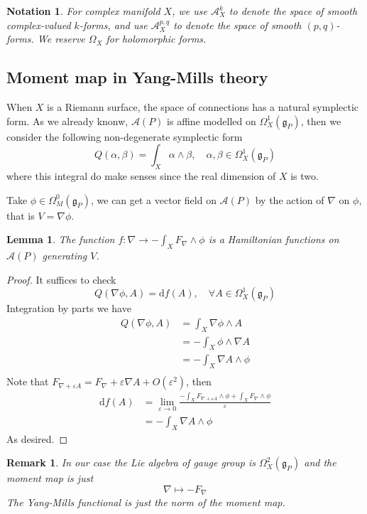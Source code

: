 \documentclass[11pt]{amsart}
\numberwithin{equation}{section}
\theoremstyle{plain}
\theoremstyle{plain}
\newtheorem{lemmasub}[thmsub]{Lemma}
\newtheorem{remksub}[thmsub]{Remark}
\newtheorem{notasub}[thmsub]{Notation}
\numberwithin{equation}{section}
\begin{document}
\begin{notasub}\normalfont
For complex manifold $X$, we use $\mathcal{A}_X^k$ to denote the space of smooth complex-valued $k$-forms, and use $\mathcal{A}_X^{p,q}$ to denote the space of smooth $(p,q)$-forms. We reserve $\Omega_X$ for holomorphic forms.
\end{notasub}

\subsection{Moment map in Yang-Mills theory}
When $X$ is a Riemann surface, the space of connections has a natural symplectic form. As we already knonw, $\mathscr{A}(P)$ is affine modelled on $\Omega_X^1(\mathfrak{g}_P)$, then we consider the following non-degenerate symplectic form
$$
Q(\alpha,\beta)=\int_X\alpha\wedge\beta,\quad \alpha,\beta\in\Omega_X^1(\mathfrak{g}_P)
$$
where this integral do make senses since the real dimension of $X$ is two.

Take $\phi\in\Omega^0_M(\mathfrak{g}_P)$, we can get a vector field on $\mathscr{A}(P)$ by the action of $\nabla$ on $\phi$, that is $V=\nabla\phi$.
\begin{lemmasub}
The function $f:\nabla\to-\int_XF_{\nabla}\wedge\phi$ is a Hamiltonian functions on $\mathscr{A}(P)$ generating $V$.
\end{lemmasub}
\begin{proof}
It suffices to check 
$$
Q(\nabla\phi,A)=\mathrm{d}f(A),\quad \forall A\in\Omega_X^1(\mathfrak{g}_P)
$$
Integration by parts we have
$$
\begin{aligned}
Q(\nabla\phi,A)&=\int_X\nabla\phi\wedge A\\
&=-\int_X\phi\wedge\nabla A\\
&=-\int_X\nabla A\wedge\phi\\
\end{aligned}
$$
Note that $F_{\nabla+\varepsilon A}=F_{\nabla}+\varepsilon\nabla A+O(\varepsilon^2)$, then
$$
\begin{aligned}
\mathrm{d}f(A)&=\lim_{\varepsilon\to 0}\frac{-\int_XF_{\nabla+\varepsilon A}\wedge\phi+\int_XF_{\nabla}\wedge\phi}{\varepsilon}\\
&=-\int_X\nabla A\wedge\phi
\end{aligned}
$$
As desired.
\end{proof}
\begin{remksub}\normalfont
In our case the Lie algebra of gauge group is $\Omega^2_X(\mathfrak{g}_P)$ and the moment map is just
$$
\nabla\mapsto -F_{\nabla}
$$
The Yang-Mills functional is just the norm of the moment map.
\end{remksub}
\end{document}
